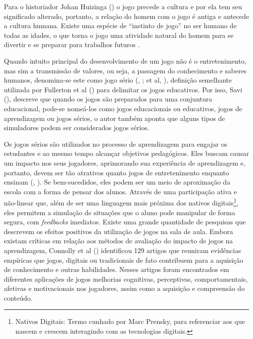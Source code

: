 Para o historiador Johan Huizinga (\citeyear{huizinga2000}) o jogo precede a cultura e por ela tem seu significado alterado, portanto, a relação do homem com o jogo é antiga e antecede a cultura humana. Existe uma espécie de “instinto de jogo” no ser humano de todas as idades, o que torna o jogo uma atividade natural do homem para se divertir e se preparar para trabalhos futuros \cite{huizinga2000}.

Quando intuito principal do desenvolvimento de um jogo não é o entretenimento, mas sim a transmissão de valores, ou seja, a passagem do conhecimento e saberes humanos, denomina-se este como jogo sério (\citeauthor{abt1970}, \citeyear{abt1970}; \citeauthor{xexeo2017} et al, \citeyear{xexeo2017}), definição semelhante utilizada por Fullerton et al (\citeyear{fullerton2004}) para  delimitar os jogos educativos. Por isso, Savi (\citeyear{savi2008}), descreve que quando os jogos são preparados para uma conjuntura educacional, pode-se nomeá-los como jogos educacionais ou educativos, jogos de aprendizagem ou jogos sérios, o autor também aponta que alguns tipos de simuladores podem ser considerados jogos sérios.

Os jogos sérios são utilizados no processo de aprendizagem para engajar os estudantes e ao mesmo tempo alcançar objetivos pedagógicos. Eles buscam causar um impacto nos seus jogadores, aprimorando sua experiência de aprendizagem e, portanto, devem ser tão atrativos quanto jogos de entretenimento enquanto ensinam (\citeauthor{bellotti2013}, \citeyear{bellotti2013}). Se bem-sucedidos, eles podem ser um meio de aproximação da escola com a forma de pensar dos alunos. Através de uma participação ativa e não-linear que, além de ser uma linguagem mais próxima dos nativos digitais\footnote{Nativos Digitais: Termo cunhado por Marc Prensky, para referenciar aos que nascem e crescem interagindo com as tecnologias digitais.}, eles permitem a simulação de situações que o aluno pode manipular de forma segura, com \textit{feedbacks} imediatos. Existe uma grande quantidade de pesquisas que descrevem os efeitos positivos da utilização de jogos na sala de aula. Embora existam críticas em relação aos métodos de avaliação do impacto de jogos na aprendizagem, Connolly et al (\citeyear{connolly2012}) identificou 129 artigos que reuniram evidências empíricas que jogos, digitais ou tradicionais de fato contribuem para a aquisição de conhecimento e outras habilidades. Nesses artigos foram encontrados em diferentes aplicações de jogos melhorias cognitivas, perceptivas, comportamentais, afetivas e motivacionais nos jogadores, assim como a aquisição e compreensão do conteúdo.

